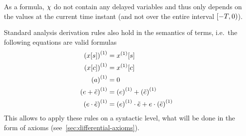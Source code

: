 
    
    As a \FOLR formula, $\chi$ do not contain any delayed variables and thus only depends on the values at the current time instant (and not over the entire interval $[-T,0)$).

    \begin{lemma}[Derivations]\label{lm:derivations}
        Standard analysis derivation rules also hold in the semantics of \ddL terms, i.e.\ the following equations are valid \ddL formulas
        \begin{align}
            \D{(\x[s])} &= \Dx[s]\\
            \D{(\x[c])} &= \Dx[c]\\
            \D{(a)} &= 0\\
            \D{(\astrm+\bstrm)} &= \D{(\astrm)}+\D{(\bstrm)}\\
            \D{(\astrm\cdot\bstrm)} &= \D{(\astrm)}\cdot\bstrm + \astrm\cdot\D{(\bstrm)}\\
        \end{align}
        This allows to apply these rules on a syntactic level, what will be done in the form of axioms (see~\ref{sec:differential-axioms}).
    \end{lemma}
